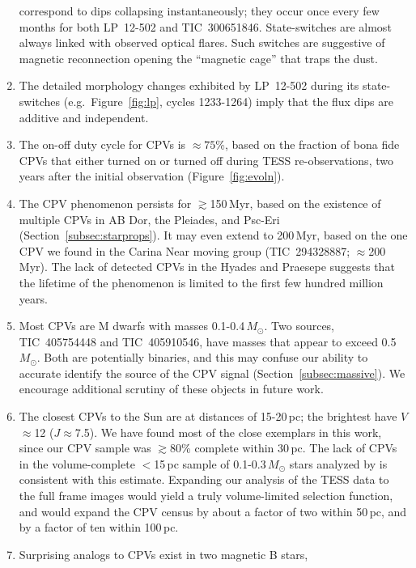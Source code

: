 \documentclass[11pt,twocolumn,tighten]{aastex63}
\begin{document}
\begin{enumerate}[leftmargin=*]
      correspond to dips collapsing instantaneously;  they occur once
      every few months for both LP~12-502 and TIC~300651846.
      State-switches are almost always linked with observed optical
      flares.  Such switches are suggestive of magnetic reconnection
      opening the ``magnetic cage'' that traps the dust.
%
    \item The detailed morphology changes exhibited by LP~12-502
      during its state-switches (e.g.\ Figure~\ref{fig:lp}, cycles
      1233-1264) imply that the flux dips are additive and
      independent.
%
    \item The on-off duty cycle for CPVs is $\approx$$75$\%, based
      on the fraction of bona fide CPVs that either turned on or turned
      off during TESS re-observations, two years after the initial
      observation (Figure~\ref{fig:evoln}).
%
    \item The CPV phenomenon persists for $\gtrsim$150\,Myr, based on
      the existence of multiple CPVs in AB Dor, the Pleiades, and
      Psc-Eri (Section~\ref{subsec:starprops}).  It may even extend to
      200\,Myr, based on the one CPV we found in the Carina Near
      moving group (TIC~294328887; $\approx$200\,Myr).  The lack of
      detected CPVs in the Hyades and Praesepe suggests that the
      lifetime of the phenomenon is limited to the first few hundred
      million years.
%
    \item Most CPVs are M dwarfs with masses 0.1-0.4\,$M_\odot$.  Two
      sources, TIC~405754448 and TIC~405910546, have masses that
      appear to exceed 0.5\,$M_\odot$.  Both are potentially binaries,
      and this may confuse our ability to accurate identify the source
      of the CPV signal (Section~\ref{subsec:massive}).  We encourage
      additional scrutiny of these objects in future work.
%
    \item The closest CPVs to the Sun are at distances of 15-20\,pc;
      the brightest have $V$$\approx$12 ($J$$\approx$7.5).  We have
      found most of the close exemplars in this work, since our CPV
      sample was $\gtrsim$80\% complete within 30\,pc.  The lack of
      CPVs in the volume-complete $<$15\,pc sample of
      0.1-0.3\,$M_\odot$ stars analyzed by \citet{2021AJ....161...63W}
      is consistent with this estimate.  Expanding our analysis of the
      TESS data to the full frame images would yield a truly
      volume-limited selection function, and would expand the CPV
      census by about a factor of two within 50\,pc, and by a factor
      of ten within 100\,pc.
%
    \item Surprising analogs to CPVs exist in two magnetic B stars,
$$
\end{enumerate}
\end{document}
